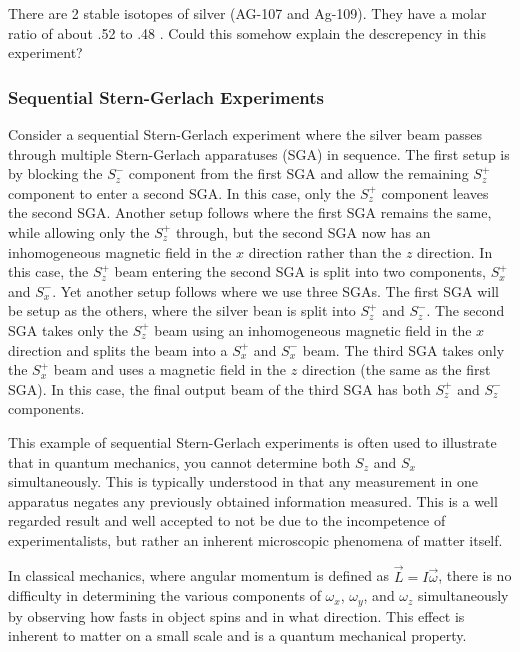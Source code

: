 \begin{questions}
	\item There are 2 stable isotopes of silver (AG-107 and Ag-109). They have a molar ratio of about .52 to .48 \cite{bib:IUPAC Periodic Table, bib:Table Of Nuclides}. Could this somehow explain the descrepency in this experiment? 
\end{questions}

\subsubsection{Sequential Stern-Gerlach Experiments}

Consider a sequential Stern-Gerlach experiment where the silver beam passes through multiple Stern-Gerlach apparatuses (SGA) in sequence. The first setup is by blocking the $S_z^-$ component from the first SGA and allow the remaining $S_z^+$ component to enter a second SGA. In this case, only the $S_z^+$ component leaves the second SGA. Another setup follows where the first SGA remains the same, while allowing only the $S_z^+$ through, but the second SGA now has an inhomogeneous magnetic field in the $x$ direction rather than the $z$ direction. In this case, the $S_z^+$ beam entering the second SGA is split into two components, $S_x^+$ and $S_x^-$. Yet another setup follows where we use three SGAs. The first SGA will be setup as the others, where the silver bean is split into $S_z^+$ and $S_z^-$. The second SGA takes only the $S_z^+$ beam using an inhomogeneous magnetic field in the $x$ direction and splits the beam into a $S_x^+$ and $S_x^-$ beam. The third SGA takes only the $S_x^+$ beam and uses a magnetic field in the $z$ direction (the same as the first SGA). In this case, the final output beam of the third SGA has both $S_z^+$ and $S_z^-$ components.

This example of sequential Stern-Gerlach experiments is often used to illustrate that in quantum mechanics, you cannot determine both $S_z$ and $S_x$ simultaneously. This is typically understood in that any measurement in one apparatus negates any previously obtained information measured. This is a well regarded result and well accepted to not be due to the incompetence of experimentalists, but rather an inherent microscopic phenomena of matter itself. 

In classical mechanics, where angular momentum is defined as $\vec{L} = I\vec{\omega}$, there is no difficulty in determining the various components of $\omega_x$, $\omega_y$, and $\omega_z$ simultaneously by observing how fasts in object spins and in what direction. This effect is inherent to matter on a small scale and is a quantum mechanical property.









